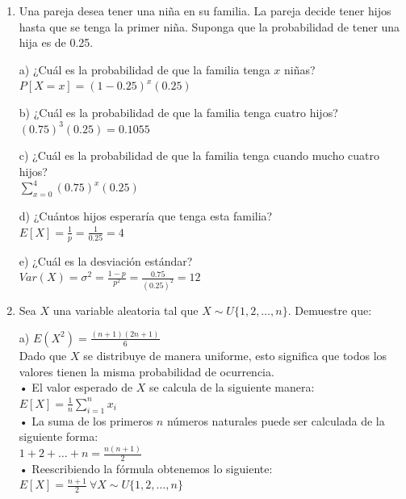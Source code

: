 \documentclass[a4paper, 12pt]{article}
\newcommand{\Pspace}{0.5cm}
\newcommand{\Aspace}{0.2cm}
\begin{document}
\begin{enumerate}
    \vspace{\Pspace}
    \item Una pareja desea tener una niña en su familia. La pareja decide tener hijos hasta que se tenga la primer niña. Suponga que la probabilidad de tener una hija es de 0.25. 
    \vspace{\Aspace} \par
    a) ¿Cuál es la probabilidad de que la familia tenga $x$ niñas?
    \\ { \color{azul} $P[X = x] = (1 - 0{.}25)^{x}(0{.}25)$ }

    \vspace{\Aspace} \par
    b) ¿Cuál es la probabilidad de que la familia tenga cuatro hijos?
    \\ { \color{azul} $(0{.}75)^{3}(0{.}25) = 0{.}1055$ }

    \vspace{\Aspace} \par
    c) ¿Cuál es la probabilidad de que la familia tenga cuando mucho cuatro hijos?
    \\ { \color{azul} $\sum\limits_{x = 0}^{4} (0{.}75)^{x}(0{.}25)$ }

    \vspace{\Aspace} \par
    d) ¿Cuántos hijos esperaría que tenga esta familia?
    \\ { \color{azul} $E[X] = \frac{1}{p} = \frac{1}{0{.}25} = 4$ }

    \vspace{\Aspace} \par
    e) ¿Cuál es la desviación estándar?
    \\ { \color{azul} $Var(X) = \sigma^{2} = \frac{1 - p}{p^{2}} = \frac{0{.}75}{(0{.}25)^{2}} = 12$ }

    
    \newpage
    \vspace{\Pspace}
    \item Sea $X$ una variable aleatoria tal que $ X \sim U\{1, 2, \dots, n\} $. Demuestre que:
    \vspace{\Aspace} \par
    a) $E(X^{2}) = \frac{(n + 1)(2n + 1)}{6}$
    \\ { \color{azul} 
        Dado que $X$ se distribuye de manera uniforme, esto significa que todos los valores tienen la misma probabilidad de ocurrencia.
        \\ • El valor esperado de $X$ se calcula de la siguiente manera:
        \\ \quad $E[X] = \frac{1}{n} \sum\limits_{i = 1}^{n} x_{i}$
        \\ • La suma de los primeros $n$ números naturales puede ser calculada de la siguiente forma:
        \\ $1 + 2 + \ldots + n = \frac{n(n + 1)}{2}$
        \\ • Reescribiendo la fórmula obtenemos lo siguiente:
        \\ $E[X] = \frac{n + 1}{2} \ \forall X \sim U\{1, 2, \ldots, n\}$
    }


\end{enumerate}
\end{document}
